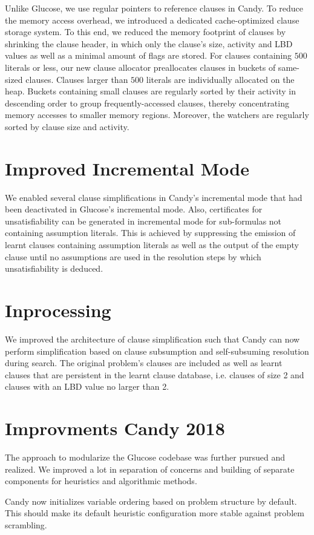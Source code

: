 \documentclass[conference]{IEEEtran}
\begin{document}
Unlike Glucose, we use regular pointers to reference clauses in Candy. To reduce the memory access overhead, we introduced a dedicated cache-optimized clause storage system.
To this end, we reduced the memory footprint of clauses by shrinking the clause header, in which only the clause's size, activity and LBD values as well as a minimal amount of flags are stored.
For clauses containing $500$ literals or less, our new clause allocator preallocates clauses in buckets of same-sized clauses.
Clauses larger than $500$ literals are individually allocated on the heap.
Buckets containing small clauses are regularly sorted by their activity in descending order to group frequently-accessed clauses, thereby concentrating memory accesses to smaller memory regions.
Moreover, the watchers are regularly sorted by clause size and activity.

\section{Improved Incremental Mode}

We enabled several clause simplifications in Candy's incremental mode that had been deactivated in Glucose's incremental mode.
Also, certificates for unsatisfiability can be generated in incremental mode for sub-formulas not containing assumption literals.
This is achieved by suppressing the emission of learnt clauses containing assumption literals as well as the output of the empty clause until no assumptions are used in the resolution steps by which unsatisfiability is deduced.

\section{Inprocessing}

We improved the architecture of clause simplification such that Candy can now perform simplification based on clause subsumption and self-subsuming resolution during search.
The original problem's clauses are included as well as learnt clauses that are persistent in the learnt clause database, i.e. clauses of size 2 and clauses with an LBD value no larger than 2.

\section{Improvments Candy 2018}

The approach to modularize the Glucose codebase was further pursued and realized. We improved a lot in separation of concerns and building of separate components for heuristics and algorithmic methods. 

Candy now initializes variable ordering based on problem structure by default. This should make its default heuristic configuration more stable against problem scrambling. 



%

\end{document}
